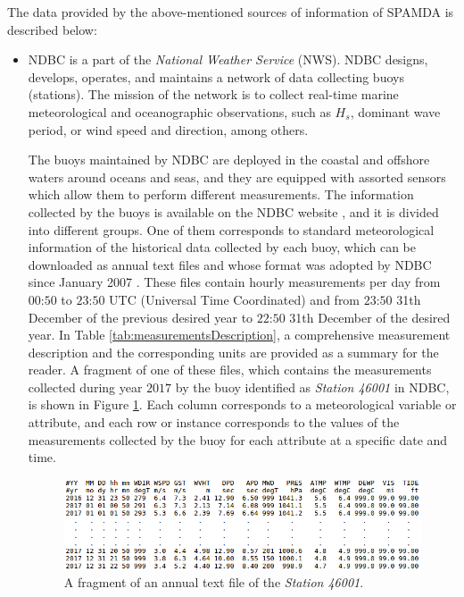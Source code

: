 \documentclass[energies,article,submit,moreauthors,pdftex]{Definitions/mdpi}
\begin{document}
		The data provided by the above-mentioned sources of information of SPAMDA is described below:
		
		\begin{itemize}[leftmargin=*,labelsep=5.8mm]
			
			\item NDBC is a part of the \textit{National Weather Service} (NWS). NDBC designs, develops, operates, and maintains a network of data collecting buoys (stations). The mission of the network is to collect real-time marine meteorological and oceanographic observations, such as $H_s$, dominant wave period, or wind speed and direction, among others.

			The buoys maintained by NDBC are deployed in the coastal and offshore waters around oceans and seas, and they are equipped with assorted sensors which allow them to perform different measurements. The information collected by the buoys is available on the NDBC website \cite{NOAA_1}, and it is divided into different groups. One of them corresponds to standard meteorological information of the historical data collected by each buoy, which can be downloaded as annual text files and whose format was adopted by NDBC since January 2007 \cite{NOAA_2}. These files contain hourly measurements per day from $00$:$50$ to $23$:$50$ UTC (Universal Time Coordinated) and from $23$:$50$ 31th December of the previous desired year to $22$:$50$ 31th December of the desired year. In Table \ref{tab:measurementsDescription}, a comprehensive measurement description and the corresponding units are provided as a summary for the reader. A fragment of one of these files, which contains the measurements collected during year $2017$ by the buoy identified as \textit{Station 46001} in NDBC, is shown in Figure \ref{fig:fragmentAnnualTexFile}. Each column corresponds to a meteorological variable or attribute, and each row or instance corresponds to the values of the measurements collected by the buoy for each attribute at a specific date and time.

			\begin{figure}[H]
				\centering
				\includegraphics[scale=0.50]{figures/FigureFragmentAnnualTextFile.png}
				\caption{A fragment of an annual text file of the \textit{Station 46001}.}
				\label{fig:fragmentAnnualTexFile}
			\end{figure}
			

\end{itemize}
\end{document}
